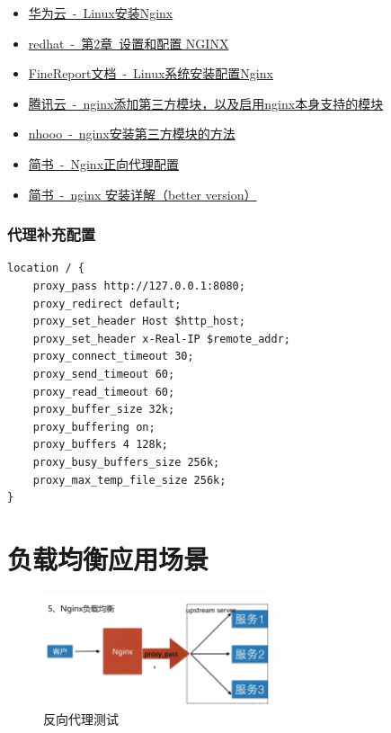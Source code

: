 \documentclass[12pt, a4paper]{article} %
\begin{document}
\begin{CJK*}{UTF8}{gbsn}
\begin{itemize}
    \item \href{https://bbs.huaweicloud.com/blogs/327420}{华为云~-~Linux安装Nginx}
    \item \href{https://access.redhat.com/documentation/zh-cn/red_hat_enterprise_linux/8/html/deploying_different_types_of_servers/setting-up-and-configuring-nginx_deploying-different-types-of-servers}{redhat~-~第2章~设置和配置 NGINX}
    \item \href{https://help.fanruan.com/finereport/doc-view-2644.html}{FineReport文档~-~Linux系统安装配置Nginx}
    \item \href{https://cloud.tencent.com/developer/article/1404153}{腾讯云~-~nginx添加第三方模块，以及启用nginx本身支持的模块}
    \item \href{http://www.nhooo.com/note/qacpfd.html}{nhooo~-~nginx安装第三方模块的方法}
    \item \href{https://www.jianshu.com/p/e265fc47eaa1}{简书~-~Nginx正向代理配置}
    \item \href{https://www.jianshu.com/p/48fd79a3cd23}{简书~-~nginx 安装详解（better version）}
\end{itemize}

\subsubsection{代理补充配置}

\begin{lstlisting}
location / {
    proxy_pass http://127.0.0.1:8080;
    proxy_redirect default;
    proxy_set_header Host $http_host;
    proxy_set_header x-Real-IP $remote_addr;
    proxy_connect_timeout 30;
    proxy_send_timeout 60;
    proxy_read_timeout 60;
    proxy_buffer_size 32k;
    proxy_buffering on;
    proxy_buffers 4 128k;
    proxy_busy_buffers_size 256k;
    proxy_max_temp_file_size 256k;
}
\end{lstlisting}

\clearpage
\section{负载均衡应用场景}

\begin{figure}[htbp]
    \centering
    \includegraphics[width=0.6\textwidth]{./imgs/catch2023-08-25-22.40.09.png}
    \caption{反向代理测试}
\end{figure}


\end{CJK*}
\end{document}

